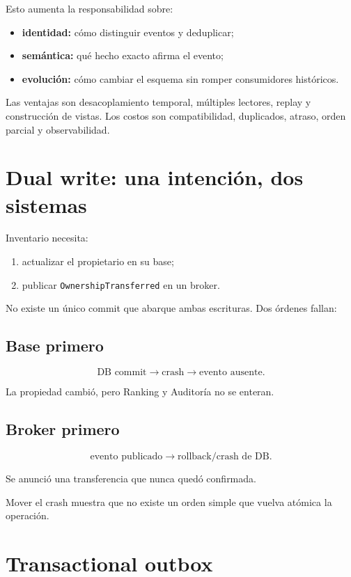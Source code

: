 \documentclass[variant=apuntes,cover=institutional,mode=screen]{ua-engineering-v6-article}
\begin{document}
Esto aumenta la responsabilidad sobre:

\begin{itemize}
\item \textbf{identidad:} cómo distinguir eventos y deduplicar;
\item \textbf{semántica:} qué hecho exacto afirma el evento;
\item \textbf{evolución:} cómo cambiar el esquema sin romper consumidores históricos.
\end{itemize}

Las ventajas son desacoplamiento temporal, múltiples lectores, replay y construcción de vistas. Los costos son compatibilidad, duplicados, atraso, orden parcial y observabilidad.

\section{Dual write: una intención, dos sistemas}

Inventario necesita:

\begin{enumerate}
\item actualizar el propietario en su base;
\item publicar \texttt{OwnershipTransferred} en un broker.
\end{enumerate}

No existe un único commit que abarque ambas escrituras. Dos órdenes fallan:

\subsection{Base primero}

\[
\text{DB commit}\rightarrow \text{crash}\rightarrow \text{evento ausente}.
\]

La propiedad cambió, pero Ranking y Auditoría no se enteran.

\subsection{Broker primero}

\[
\text{evento publicado}\rightarrow \text{rollback/crash de DB}.
\]

Se anunció una transferencia que nunca quedó confirmada.

Mover el crash muestra que no existe un orden simple que vuelva atómica la operación.

\section{Transactional outbox}
\end{document}
